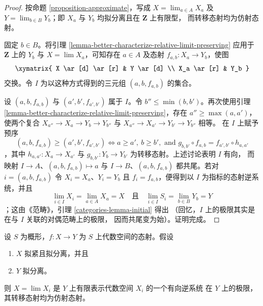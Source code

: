 \begin{proof}
按命题 \ref{proposition-approximate}，写成
$X = \lim_{a \in A} X_a$ 及 $Y = \lim_{b \in B} Y_b$；即
$X_a$ 与 $Y_b$ 均拟分离且在 $\mathbf{Z}$ 上有限型，
而转移态射均为仿射态射。

\medskip\noindent
固定 $b \in B$。将引理
\ref{lemma-better-characterize-relative-limit-preserving}
应用于 $\mathbf{Z}$ 上的 $Y_b$ 与 $X = \lim X_a$，可知存在
$a \in A$ 及态射 $f_{a,b} : X_a \to Y_b$，使图
$$
\xymatrix{
X \ar[d] \ar[r] & Y \ar[d] \\
X_a \ar[r] & Y_b
}
$$
交换。令 $I$ 为以这种方式得到的三元组 $(a,b,f_{a,b})$ 的集合。

\medskip\noindent
设 $(a,b,f_{a,b})$ 与 $(a',b',f_{a',b'})$ 属于 $I$。令
$b'' \leq \min(b,b')$。再次使用引理
\ref{lemma-better-characterize-relative-limit-preserving}，存在
$a'' \geq \max(a,a')$，使两个复合
$X_{a''} \to X_a \to Y_b \to Y_{b''}$ 与
$X_{a''} \to X_{a'} \to Y_{b'} \to Y_{b''}$ 相等。
在 $I$ 上赋予预序
$$
(a, b, f_{a, b}) \geq (a', b', f_{a', b'})
\Leftrightarrow
a \geq a',\ b \geq b',\text{ and }
g_{b, b'} \circ f_{a, b} = f_{a', b'} \circ h_{a, a'}
$$
，其中 $h_{a,a'} : X_a \to X_{a'}$ 与
$g_{b,b'} : Y_b \to Y_{b'}$ 为转移态射。上述讨论表明 $I$ 有向，
而映射 $I \to A$、$(a,b,f_{a,b}) \mapsto a$ 与
$I \to B$、$(a,b,f_{a,b})$ 都共尾。若对
$i = (a,b,f_{a,b})$ 令 $X_i = X_a$、$Y_i = Y_b$ 且
$f_i = f_{a,b}$，便得到以 $I$ 为指标的态射逆系统，并且
$$
\lim_{i \in I} X_i = \lim_{a \in A} X_a = X
\quad\text{且}\quad
\lim_{i \in I} S_i = \lim_{b \in B} Y_b = Y
$$
；这由《范畴》，引理 \ref{categories-lemma-initial} 得出
（回忆，$I$ 上的极限其实是在与 $I$ 关联的对偶范畴上的极限，
因而共尾变为始）。证明完成。
\end{proof}

\begin{lemma}
\label{lemma-relative-approximation}
设 $S$ 为概形，$f : X \to Y$ 为 $S$ 上代数空间的态射。假设
\begin{enumerate}
\item $X$ 拟紧且拟分离，并且
\item $Y$ 拟分离。
\end{enumerate}
则 $X = \lim X_i$ 是 $Y$ 上有限表示代数空间 $X_i$ 的一个有向逆系统
在 $Y$ 上的极限，其转移态射均为仿射态射。
\end{lemma}

